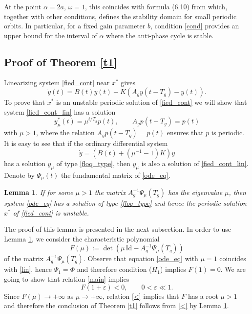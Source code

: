\documentclass{article}
\let\epsilon\varepsilon
\let\varepsilon\epsilon
\newtheorem{lemma}[theorem]{Lemma}
\begin{document}
At the point $\alpha = 2a$, $\omega = 1$, this coincides with  formula (6.10) from \cite{fiedler_Z_2} which, together with other conditions, defines the stability domain for small periodic orbits. In particular, for a fixed gain parameter $b$,
condition \eqref{cond} provides an upper bound for the interval of $\alpha$ where the anti-phase cycle is stable.

\subsection{Proof of Theorem \ref{t1}}

Linearizing system \eqref{fied_cont} near $x^*$ gives
\begin{equation}\label{fied_cont_lin}
\dot y(t) = B(t)y(t)+ K(A_gy(t-T_g)-y(t)).
\end{equation}
To prove that $x^*$ is an unstable periodic solution of \eqref{fied_cont} we will show that system \eqref{fied_cont_lin} has a solution
\begin{equation}\label{floq_type}
y_\mu^*(t) = \mu^{t/T_g}p(t),\qquad A_g p(t-T_g)=p(t)
\end{equation} 
with $\mu>1$, where the relation $A_g p(t-T_g)=p(t)$ ensures that $p$ is periodic.
It is easy to see that if the ordinary differential system
\begin{equation}\label{ode_eq}
\dot y = \left(B(t)+(\mu^{-1}- 1)K \right) y
\end{equation}
has a solution $y_\mu$ of type \eqref{floq_type}, then $y_\mu$ is also a solution of \eqref{fied_cont_lin}.
Denote by $\Psi_\mu(t)$ the fundamental matrix of \eqref{ode_eq}.

\begin{lemma}\label{l1}
If for some $\mu>1$ the matrix $ A_g^{-1}\Psi_\mu (T_g)$ has the eigenvalue $\mu$, then system \eqref{ode_eq} has a solution of type \eqref{floq_type} and hence 
the periodic solution $x^*$ of \eqref{fied_cont} is unstable.
\end{lemma}

The proof of this lemma is presented in the next subsection.
In order to use Lemma \ref{l1}, we consider the characteristic
polynomial 
$$
F(\mu):=\det\left(\mu\, \mathbb{I}\text{d} - A_g^{-1}\Psi_\mu(T_g)\right)
$$
of the matrix $ A_g^{-1}\Psi_\mu (T_g)$. Observe that 
equation \eqref{ode_eq} with $\mu=1$ coincides with \eqref{lin},
hence $\Psi_1=\Phi$ and therefore condition ($H_1$) implies $F(1)=0$.
We are going to show that relation \eqref{main} implies
\begin{equation}\label{<}
F(1+\varepsilon)<0,\qquad 0<\varepsilon\ll 1.
\end{equation}
Since  $F(\mu) \to +\infty$ as ${\mu \to +\infty}$, relation \eqref{<} implies that $F$ has a root $\mu>1$
and therefore the conclusion of Theorem \ref{t1} follows from \eqref{<} by Lemma \ref{l1}.
\end{document}
